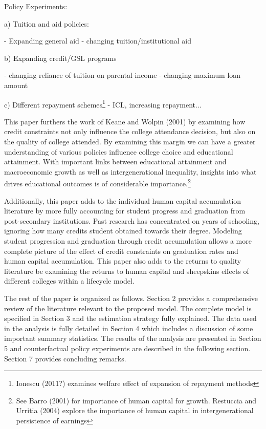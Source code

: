 \documentclass[letterpaper,12pt]{article}
\begin{document}
Policy Experiments:

a) Tuition and aid policies:

- Expanding general aid
- changing tuition/institutional aid

b) Expanding credit/GSL programs 

- changing reliance of tuition on parental income
- changing maximum loan amount

c) Different repayment schemes\footnote{Ionescu (2011?) examines welfare effect of expansion of repayment methods} 
- ICL, increasing repayment...

This paper furthers the work of Keane and Wolpin (2001) by examining how credit constraints not only influence the college attendance decision, but also on the quality of college attended. By examining this margin we can have a greater understanding of various policies influence college choice and educational attainment. With important links between educational attainment and macroeconomic growth as well as intergenerational inequality, insights into what drives educational outcomes is of considerable importance.\footnote{See Barro (2001) for importance of human capital for growth. Restuccia and Urritia (2004) explore the importance of human capital in intergenerational persistence of earnings} 

Additionally, this paper adds to the individual human capital accumulation literature by more fully accounting for student progress and graduation from post-secondary institutions. Past research has concentrated on years of schooling, ignoring how many credits student obtained towards their degree. Modeling student progression and graduation through credit accumulation allows a more complete picture of the effect of credit constraints on graduation rates and human capital accumulation. This paper also adds to the returns to quality literature be examining the returns to human capital and sheepskins effects of different colleges within a lifecycle model. 

The rest of the paper is organized as follows. Section 2 provides a comprehensive review of the literature relevant to the proposed model. The complete model is specified in Section 3 and the estimation strategy fully explained. The data used in the analysis is fully detailed in Section 4 which includes a discussion of some important summary statistics. The results of the analysis are presented in Section 5 and counterfactual policy experiments are described in the following section. Section 7 provides concluding remarks. 
\end{document}
